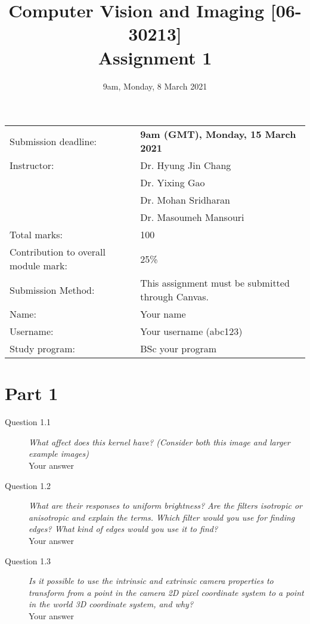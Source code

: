 \documentclass[a4paper, oneside]{article}
\newcommand{\assignment}[0]{assignment\xspace}
\newcommand{\Assignment}[0]{Assignment\xspace}
\begin{document}
	\title{Computer Vision and Imaging [06-30213]\\ \Assignment 1}
	\date{9am, Monday, 8 March 2021}
	
	\maketitle
	\begin{tabularx}{\textwidth}{lX}
		Submission deadline: & \textbf{9am (GMT), Monday, 15 March 2021}\\
		Instructor: & Dr. Hyung Jin Chang\\
		            & Dr. Yixing Gao\\
		            & Dr. Mohan Sridharan\\
		            & Dr. Masoumeh Mansouri\\
		Total marks: & 100\\
		Contribution to overall module mark: & 25\%\\
		Submission Method: & This \assignment must be submitted through Canvas.\\

		\addlinespace[1cm]
		Name: & Your name\\
		Username: & Your username (abc123)\\		
		Study program: &  BSc your program\\
	\end{tabularx}
	\section*{Part 1}
	\begin{description}		
		\item[Question 1.1 ] \emph{What affect does this kernel have? (Consider both this image and larger example images)}
		\\ Your answer
		\item[Question 1.2 ] \emph{What are their responses to uniform brightness? Are the filters isotropic or anisotropic and explain the terms. Which filter would you use for finding edges? What kind of edges would you use it to find?}
		\\ Your answer
		\item[Question 1.3]
		\emph{Is it possible to use the intrinsic and extrinsic camera properties to transform from a point in the camera 2D pixel coordinate system to a point in the world 3D coordinate system, and why?}
		\\ Your answer

	\end{description}
	
\end{document}
